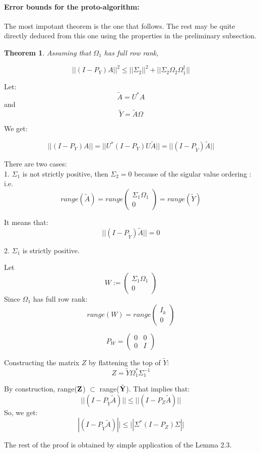 \documentclass[onecolumn,11pt]{article}
\newtheorem{theorem}{Theorem}[section]
\newenvironment{proof}[1][Proof]{\begin{trivlist}
\item[\hskip \labelsep {\bfseries #1}]}{\end{trivlist}}
\begin{document}
\paragraph{Error bounds for the proto-algorithm:}
The most impotant theorem is the one that follows. The rest may be quite directly deduced from this one using the properties in the preliminary subsection.
\begin{theorem}
Assuming that $\Omega_1$ has full row rank, 

\begin{equation}
||(I-P_Y)A||^2\leq ||\Sigma_2||^2+||\Sigma_2\Omega_2\Omega_1^{\dagger}||
\end{equation} 
\end{theorem}
\begin{proof}
Let: 
$$\tilde{A}=U^* A$$
and 
$$\tilde{Y}=\tilde{A} \Omega$$

We get:

$$||(I-P_Y)A||=||U^* (I-P_Y)U\tilde{A}||=||(I-P_{\tilde{Y}})\tilde{A}||$$

There are two cases:\\

1. $\Sigma_1$ is not strictly positive, then $\Sigma_2=0$ because of the sigular value ordering : i.e. 
$$range(\tilde{A})=range\begin{pmatrix}
\Sigma_1 \Omega_1\\
0
\end{pmatrix} = range(\tilde{Y})$$

It means that: $$||(I-P_{\tilde{Y}})\tilde{A}||=0$$

2. $\Sigma_1$ is strictly positive.

Let $$W:=\begin{pmatrix}
\Sigma_1 \Omega_1\\
0
\end{pmatrix} $$
Since $\Omega_1$ has full row rank:
$$range(W)=range\begin{pmatrix}
I_k\\
0
\end{pmatrix} $$

$$P_W=\begin{pmatrix}
0 & 0\\
0 & I
\end{pmatrix} $$

Constructing the matrix $Z$ by flattening the top of
$\tilde{Y}$:
\begin{equation}
Z = \tilde{Y} \Omega_1^* \Sigma_1^{-1}
\end{equation}

By construction, range($\bold{Z}$) $\subset$ range($\tilde{\bold{Y}}$). That
implies that:
\begin{equation}
||(I - P_{\tilde{Y}} \tilde{A}) || \leq
||(I - P_{Z} \tilde{A})||
\end{equation}
So, we get:
\begin{equation}
|(I - P_{\tilde{Y}} \tilde{A}) || \leq
||\Sigma^* (I - P_Z) \Sigma ||
\end{equation}

The rest of the proof is obtained by simple application of the Lemma 2.3.
\end{proof}
\end{document}
